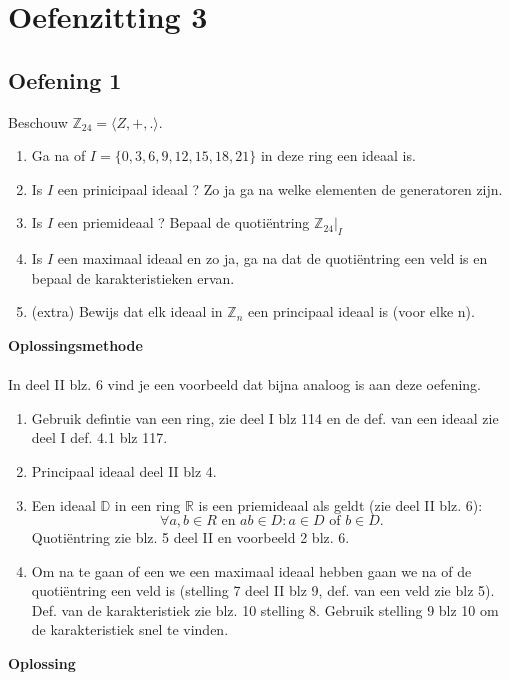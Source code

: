 \documentclass[11pt,a4paper,titlepage]{article}
\begin{document}
\section{Oefenzitting 3}
\subsection{Oefening 1}
Beschouw $\mathbb{Z}_{24} = \langle Z, +, .\rangle$.
\begin{enumerate}[label=(\alph*)]
	\item Ga na of $I = \{0,3,6,9,12,15,18,21\}$ in deze ring een ideaal is.
	\item Is $I$ een prinicipaal ideaal ? Zo ja ga na welke elementen de generatoren zijn.
	\item Is $I$ een priemideaal ? Bepaal de quotiëntring $\mathbb{Z}_{24}|_I$
	\item Is $I$ een maximaal ideaal en zo ja, ga na dat de quotiëntring een veld is en bepaal de karakteristieken ervan.
	\item (extra) Bewijs dat elk ideaal in $\mathbb{Z}_n$ een principaal ideaal is (voor elke n).
\end{enumerate}
\textbf{Oplossingsmethode} \\ \\
In deel II blz. 6 vind je een voorbeeld dat bijna analoog is aan deze oefening.
\begin{enumerate}[label=(\alph*)]
	\item Gebruik defintie van een ring, zie deel I blz 114 en de def. van een ideaal zie deel I def. 4.1 blz 117.
	\item Principaal ideaal deel II blz 4.
	\item Een ideaal $\mathbb{D}$ in een ring $\mathbb{R}$ is een priemideaal als geldt (zie deel II blz. 6):
		$$\forall a, b \in R \text{ en } ab \in D: a\in D \text{ of } b\in D.$$
		Quotiëntring zie blz. 5 deel II en voorbeeld 2 blz. 6.
	\item Om na te gaan of een we een maximaal ideaal hebben gaan we na of de quotiëntring een veld is (stelling 7 deel II blz 9, def. van een veld zie blz 5). \\
		Def. van de karakteristiek zie blz. 10 stelling 8. Gebruik stelling 9 blz 10 om de karakteristiek snel te vinden.
\end{enumerate}
\textbf{Oplossing}
\end{document}
